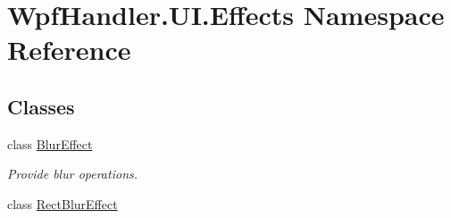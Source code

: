 \hypertarget{namespace_wpf_handler_1_1_u_i_1_1_effects}{}\section{Wpf\+Handler.\+U\+I.\+Effects Namespace Reference}
\label{namespace_wpf_handler_1_1_u_i_1_1_effects}
\subsection*{Classes}
\begin{DoxyCompactItemize}
\item 
class \mbox{\hyperlink{class_wpf_handler_1_1_u_i_1_1_effects_1_1_blur_effect}{Blur\+Effect}}
\begin{DoxyCompactList}\small\item\em Provide blur operations. \end{DoxyCompactList}\item 
class \mbox{\hyperlink{class_wpf_handler_1_1_u_i_1_1_effects_1_1_rect_blur_effect}{Rect\+Blur\+Effect}}
\end{DoxyCompactItemize}
